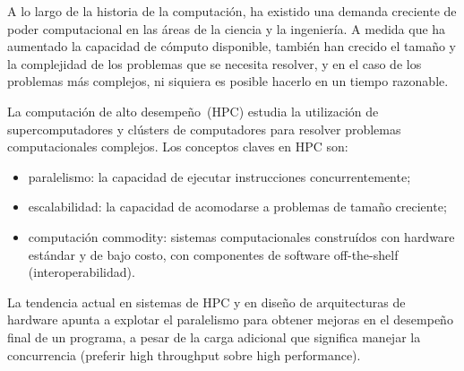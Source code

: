 \documentclass[11pt,spanish]{article}
\begin{document}
A lo largo de la historia de la computación, ha existido una demanda creciente de poder
computacional en las áreas de la ciencia y la ingeniería.  A medida que ha
aumentado la capacidad de cómputo disponible, también han crecido el tamaño y la
complejidad de los problemas que se necesita resolver, y en el caso de los
problemas más complejos, ni siquiera es posible hacerlo en un tiempo razonable.
\cite{parallel-programming}

La computación de alto desempeño~(HPC) estudia la utilización de supercomputadores y
clústers de computadores para resolver problemas computacionales complejos.  Los
conceptos claves en HPC son:
\begin{itemize}
   \item paralelismo:
     la capacidad de ejecutar instrucciones concurrentemente;
   \item escalabilidad:
     la capacidad de acomodarse a problemas de tamaño creciente;
   \item computación commodity:
     sistemas computacionales construídos con hardware
     estándar y de bajo costo, con componentes de software off-the-shelf
     (interoperabilidad).
\end{itemize}
La tendencia actual en sistemas de HPC y en diseño de arquitecturas de hardware
apunta a explotar el paralelismo para obtener mejoras en el desempeño final de un
programa, a pesar de la carga adicional que significa manejar la concurrencia
(preferir high throughput sobre high performance).
\end{document}
